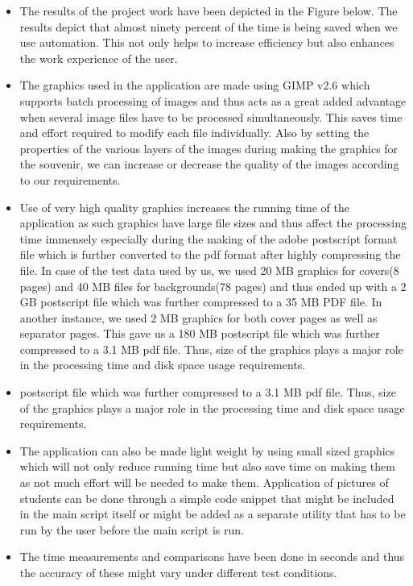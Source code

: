 
\begin{itemize}
\item The results of the project work have been depicted in the Figure below. The results depict that almost ninety percent of the time is being saved when we use automation. This not only helps to increase efficiency but also enhances the work experience of the user.
\item The graphics used in the application are made using GIMP v2.6 which supports batch processing of images and thus acts as a great added advantage when several image files have to be processed simultaneously. This saves time and effort required to modify each file individually. Also by setting the properties of the various layers of the images during making the graphics for the souvenir, we can increase or decrease the quality of the images according to our requirements.
\item Use of very high quality graphics increases the running time of the application as such graphics have large file sizes and thus affect the processing time immensely especially during the making of the adobe postscript format file which is further converted to the pdf format after highly compressing the file. In case of the test data used by us, we used 20 MB graphics for covers(8 pages) and 40 MB files for backgrounds(78 pages) and thus ended up with a 2 GB postscript file which was further compressed to a 35 MB PDF file. In another instance, we used 2 MB graphics for both cover pages as well as separator pages. This gave us a 180 MB postscript file which was further compressed to a 3.1 MB pdf file. Thus, size of the graphics plays a major role in the processing time and disk space usage requirements.
\item postscript file which was further compressed to a 3.1 MB pdf file. Thus, size of the graphics plays a major role in the processing time and disk space usage requirements.
\item The application can also be made light weight by using small sized graphics which
will not only reduce running time but also save time on making them as not much effort will be needed to make them. Application of pictures of students can be done through a simple code snippet that might be included in the main script itself or might be added as a separate utility that has to be run by the user before the main script is run.
\item The time measurements and comparisons have been done in seconds and thus the accuracy of these might vary under different test conditions.
\end{itemize}

